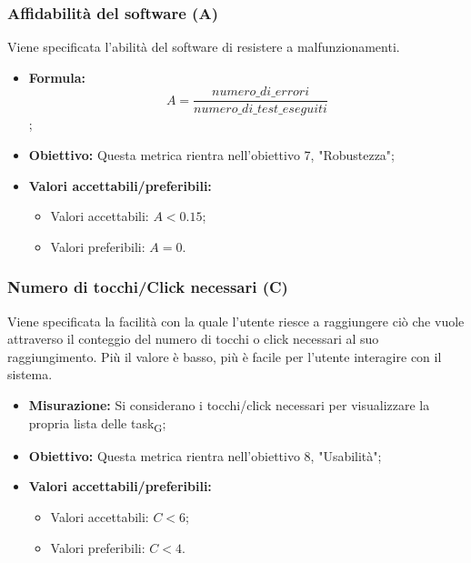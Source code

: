 \subsubsection{Affidabilità del software (A)}
Viene specificata l'abilità del software di resistere a malfunzionamenti.
\begin{itemize}
	\item \textbf{Formula:} \[A = \frac{numero\_di\_errori}{numero\_di\_test\_eseguiti}\];
	\item \textbf{Obiettivo:} Questa metrica rientra nell'obiettivo 7, "Robustezza";
	\item \textbf{Valori accettabili/preferibili: }
	\begin{itemize}
		\item Valori accettabili: $A < 0.15$;
		\item Valori preferibili: $A = 0$.
	\end{itemize}
\end{itemize}


\subsubsection{Numero di tocchi/Click necessari (C)}
Viene specificata la facilità con la quale l'utente riesce a raggiungere ciò che vuole attraverso il conteggio del numero di tocchi o click necessari al suo raggiungimento. Più il valore è basso, più è facile per l'utente interagire con il sistema.
\begin{itemize}
	\item \textbf{Misurazione:} Si considerano i tocchi/click necessari per visualizzare la propria lista delle task\textsubscript{G};
	\item \textbf{Obiettivo:} Questa metrica rientra nell'obiettivo 8, "Usabilità";
	\item \textbf{Valori accettabili/preferibili: }
	\begin{itemize}
		\item Valori accettabili: $C < 6$;
		\item Valori preferibili: $C < 4$.
	\end{itemize}
\end{itemize}

